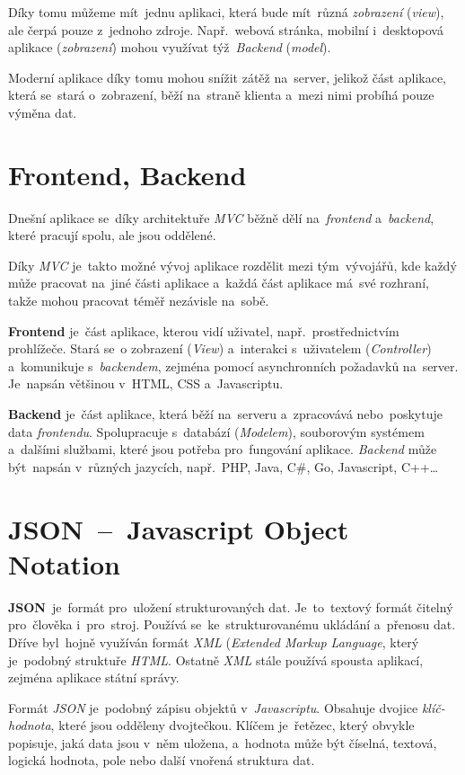 \documentclass[11pt,a4paper]{report}
\begin{document}
            Díky tomu můžeme mít~jednu aplikaci, která bude mít~různá \emph{zobrazení} (\emph{view}), ale čerpá pouze z~jednoho zdroje. Např.~webová stránka, mobilní i~desktopová aplikace (\emph{zobrazení}) mohou využívat týž~\emph{Backend} (\emph{model}).
            
            Moderní aplikace díky tomu mohou snížit zátěž na~server, jelikož část aplikace, která se~stará o~zobrazení, běží na~straně klienta a~mezi nimi probíhá pouze výměna dat.

        \section{Frontend, Backend}
            Dnešní aplikace se~díky architektuře \emph{MVC} běžně dělí na~\emph{frontend} a~\emph{backend}, které pracují spolu, ale jsou oddělené.

            Díky \emph{MVC} je~takto možné vývoj aplikace rozdělit mezi tým~vývojářů, kde každý může pracovat na~jiné části aplikace a~každá část aplikace má~své rozhraní, takže mohou pracovat téměř nezávisle na~sobě.

            \textbf{Frontend} je~část aplikace, kterou vidí uživatel, např.~prostřednictvím prohlížeče. Stará se~o zobrazení (\emph{View}) a~interakci s~uživatelem (\emph{Controller}) a~komunikuje s~\emph{backendem}, zejména pomocí asynchronních požadavků na~server. Je~napsán většinou v~HTML, CSS a~Javascriptu.

            \textbf{Backend} je~část aplikace, která běží na~serveru a~zpracovává nebo~poskytuje data \emph{frontendu}. Spolupracuje s~databází (\emph{Modelem}), souborovým systémem a~dalšími službami, které jsou potřeba pro~fungování aplikace. \emph{Backend} může být~napsán v~různých jazycích, např.~PHP, Java, C\#, Go, Javascript, C++\dots

        \section{JSON~--~Javascript Object Notation}
            \textbf{JSON}~je~formát pro~uložení strukturovaných dat. Je~to~textový formát čitelný pro~člověka i~pro~stroj. Používá se~ke~strukturovanému ukládání a~přenosu dat. Dříve byl~hojně využíván formát \emph{XML} (\emph{Extended Markup Language}, který je~podobný struktuře \emph{HTML}. Ostatně \emph{XML} stále používá spousta aplikací, zejména aplikace státní správy.

            Formát \emph{JSON} je~podobný zápisu objektů v~\emph{Javascriptu}. Obsahuje dvojice \emph{klíč-hodnota}, které jsou odděleny dvojtečkou. Klíčem je~řetězec, který obvykle popisuje, jaká data jsou v~něm uložena, a~hodnota může být číselná, textová, logická hodnota, pole nebo další vnořená struktura dat.
            
\end{document}
